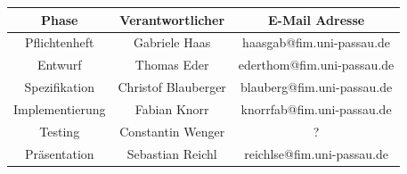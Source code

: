 \documentclass[10pt]{report}
\begin{document}
\begin{center}
\vspace{1.5 cm}
\begin{tabular}{|c|c|c|}
\hline 
\rule[-1ex]{0pt}{4ex} \textbf{Phase} & \textbf{Verantwortlicher} & \textbf{E-Mail Adresse} \\ 
\hline  \hline
\rule[-1ex]{0pt}{4ex} Pflichtenheft & Gabriele Haas & haasgab@fim.uni-passau.de \\ 
\hline  \hline
\rule[-1ex]{0pt}{4ex} Entwurf & Thomas Eder & ederthom@fim.uni-passau.de \\ 
\hline  \hline
\rule[-1ex]{0pt}{4ex} Spezifikation & Christof Blauberger & blauberg@fim.uni-passau.de \\ 
\hline  \hline
\rule[-1ex]{0pt}{4ex} Implementierung & Fabian Knorr & knorrfab@fim.uni-passau.de \\ 
\hline \hline 
\rule[-1ex]{0pt}{4ex} Testing & Constantin Wenger & ? \\ 
\hline  \hline
\rule[-1ex]{0pt}{4ex} Präsentation & Sebastian Reichl & reichlse@fim.uni-passau.de \\ 
\hline 
\end{tabular}

\end{center}


\tableofcontents














\end{document}
